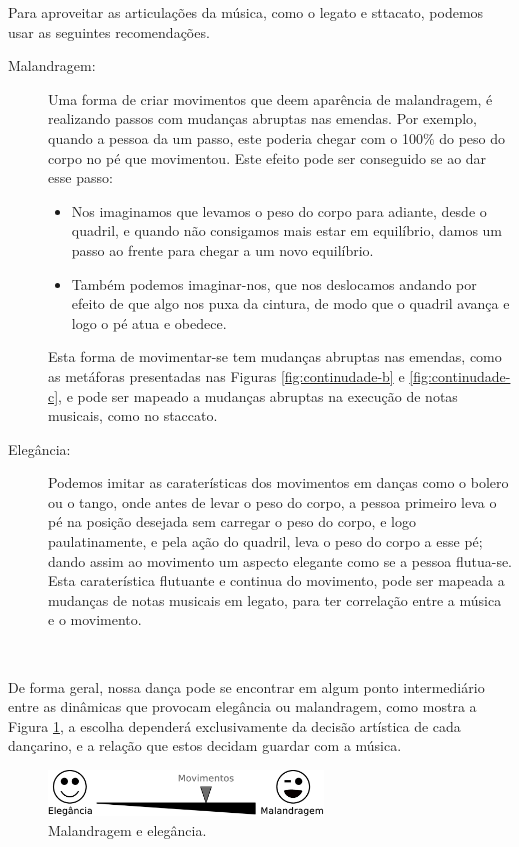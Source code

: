 Para aproveitar as articulações da música, como o legato e sttacato,
podemos usar as seguintes recomendações.\\
\begin{description}
\item[Malandragem:] Uma forma de criar movimentos que deem aparência de malandragem,
é realizando passos com mudanças abruptas nas emendas.
Por exemplo, quando a pessoa da um passo, 
este poderia chegar com o 100\% do peso do corpo no pé que movimentou.
Este efeito pode ser conseguido se ao dar esse passo:
\begin{itemize}
\item Nos imaginamos que levamos o peso do corpo para adiante, desde o quadril,
e quando não consigamos mais estar em equilíbrio, 
damos um passo ao frente para chegar a um novo equilíbrio.
\item Também podemos imaginar-nos, 
que nos deslocamos  andando por efeito de que algo nos puxa da cintura,
de modo que o quadril avança e logo o pé atua e obedece.
\end{itemize}
Esta forma de movimentar-se tem mudanças abruptas nas emendas,
como as metáforas presentadas nas Figuras \ref{fig:continudade-b} e  \ref{fig:continudade-c},
e pode ser mapeado a mudanças abruptas na execução de notas musicais,
como no staccato.



\item[Elegância:] Podemos imitar as caraterísticas dos movimentos em danças como o bolero ou o tango,
onde antes de levar o peso do corpo, 
a pessoa primeiro leva o pé na posição desejada sem carregar o peso do corpo,
e logo paulatinamente, e pela ação do quadril, leva o peso do corpo a esse pé;
dando assim ao movimento um aspecto elegante como se a pessoa flutua-se.\\
Esta caraterística flutuante e continua do movimento, 
pode ser mapeada a mudanças de notas musicais em legato,
para ter correlação entre a música e o movimento.
\end{description}~

De forma geral, 
nossa dança pode se encontrar em algum ponto intermediário entre as dinâmicas que provocam elegância ou malandragem, 
como mostra a Figura \ref{fig:malandragem-elegancia},
a escolha dependerá exclusivamente da decisão artística de cada dançarino,
e a relação que estos decidam guardar com a música.
\begin{figure}[!h]
  \centering
    \includegraphics[width=0.65\textwidth]{chapters/cap-musicalidade/malandragem-elegancia.eps}
\caption{Malandragem e elegância.}
\label{fig:malandragem-elegancia}
\end{figure}


